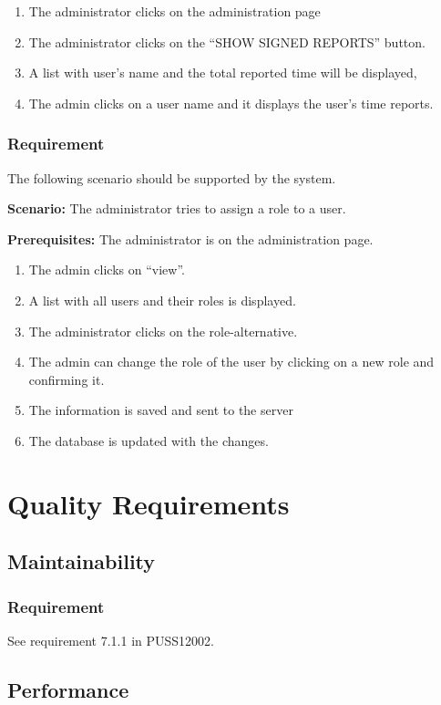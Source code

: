 \documentclass{article}
\begin{document}
\begin{enumerate}
    \item The administrator clicks on the administration page 
    \item The administrator clicks on the “SHOW SIGNED REPORTS” button.
    \item A list with user’s name and the total reported time will be displayed,
    \item The admin clicks on a user name and it displays the user’s time reports.
\end{enumerate}

\subsubsection{Requirement}
The following scenario should be supported by the system.

\textbf{Scenario:} The administrator tries to assign a role to a user.

\textbf{Prerequisites:} The administrator is on the administration page.

\begin{enumerate}
    \item The admin clicks on “view”.
    \item A list with all users and their roles is displayed.
    \item The administrator clicks on the role-alternative.
    \item The admin can change the role of the user by clicking on a new role and confirming it.
    \item The information is saved and sent to the server
    \item The database is updated with the changes.
\end{enumerate}



\section{Quality Requirements}
\subsection{Maintainability}
\subsubsection{Requirement}
See requirement 7.1.1 in PUSS12002.
\subsection{Performance}
\end{document}
